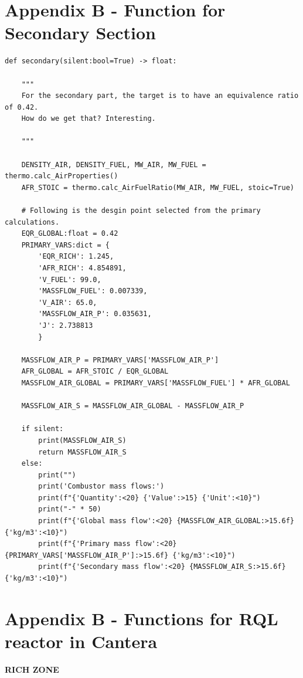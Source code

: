 \clearpage

\section*{Appendix B - Function for Secondary Section}

\begin{verbatim}
def secondary(silent:bool=True) -> float:

    """
    For the secondary part, the target is to have an equivalence ratio of 0.42.
    How do we get that? Interesting.
    
    """

    DENSITY_AIR, DENSITY_FUEL, MW_AIR, MW_FUEL = thermo.calc_AirProperties()
    AFR_STOIC = thermo.calc_AirFuelRatio(MW_AIR, MW_FUEL, stoic=True)

    # Following is the desgin point selected from the primary calculations.
    EQR_GLOBAL:float = 0.42
    PRIMARY_VARS:dict = {
        'EQR_RICH': 1.245,
        'AFR_RICH': 4.854891, 
        'V_FUEL': 99.0, 
        'MASSFLOW_FUEL': 0.007339, 
        'V_AIR': 65.0, 
        'MASSFLOW_AIR_P': 0.035631, 
        'J': 2.738813
        }

    MASSFLOW_AIR_P = PRIMARY_VARS['MASSFLOW_AIR_P']
    AFR_GLOBAL = AFR_STOIC / EQR_GLOBAL
    MASSFLOW_AIR_GLOBAL = PRIMARY_VARS['MASSFLOW_FUEL'] * AFR_GLOBAL

    MASSFLOW_AIR_S = MASSFLOW_AIR_GLOBAL - MASSFLOW_AIR_P

    if silent:
        print(MASSFLOW_AIR_S)
        return MASSFLOW_AIR_S
    else:
        print("")
        print('Combustor mass flows:')
        print(f"{'Quantity':<20} {'Value':>15} {'Unit':<10}")
        print("-" * 50)
        print(f"{'Global mass flow':<20} {MASSFLOW_AIR_GLOBAL:>15.6f} {'kg/m3':<10}")
        print(f"{'Primary mass flow':<20} {PRIMARY_VARS['MASSFLOW_AIR_P']:>15.6f} {'kg/m3':<10}")
        print(f"{'Secondary mass flow':<20} {MASSFLOW_AIR_S:>15.6f} {'kg/m3':<10}")

\end{verbatim}

\clearpage


\section*{Appendix B - Functions for RQL reactor in Cantera}


\textbf{RICH ZONE}

